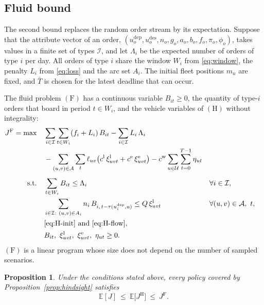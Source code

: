 \documentclass[12pt]{article}
\theoremstyle{plain}
\newtheorem{proposition}{Proposition}
\theoremstyle{definition}
\newcommand{\dep}{u^{\mathrm{dep}}}
\newcommand{\des}{u^{\mathrm{des}}}
\begin{document}
\subsection{Fluid bound}\label{sec:fluid}

The second bound replaces the random order stream by its expectation. Suppose that the attribute vector of an order, $(\dep_o,\des_o,n_o,g_o,a_o,b_o,f_o,\pi_o,\phi_o)$, takes values in a finite set of types $\mathcal{I}$, and let $\Lambda_i$ be the expected number of orders of type $i$ per day. All orders of type $i$ share the window $W_i$ from \eqref{eq:window}, the penalty $L_i$ from \eqref{eq:loss} and the arc set $A_i$. The initial fleet positions $m_u$ are fixed, and $\bar T$ is chosen for the latest deadline that can occur.

The fluid problem $(\mathrm{F})$ has a continuous variable $B_{it}\ge 0$, the quantity of type-$i$ orders that board in period $t\in W_i$, and the vehicle variables of $(\mathrm{H})$ without integrality:
\begin{align}
J^{\mathrm{F}}=\max\quad
& \sum_{i\in\mathcal{I}}\sum_{t\in W_i}(f_i+L_i)\,B_{it}-\sum_{i\in\mathcal{I}}L_i\,\Lambda_i \notag\\
& -\sum_{(u,v)\in\mathcal{A}}\sum_{t}\ell_{uv}\bigl(c^{\mathrm{l}}\,\xi^{\mathrm{l}}_{uvt}+c^{\mathrm{e}}\,\xi^{\mathrm{e}}_{uvt}\bigr)
 -c^{\mathrm{w}}\sum_{u\in\mathcal{U}}\sum_{t=0}^{T-1}\eta_{ut} \label{eq:F-obj}\\[4pt]
\text{s.t.}\quad
& \sum_{t\in W_i}B_{it}\le\Lambda_i && \forall i\in\mathcal{I}, \label{eq:F-demand}\\
& \sum_{i\in\mathcal{I}:\ (u,v)\in A_i} n_i\,B_{i,\,t-\tau(\dep_i,u)}\le Q\,\xi^{\mathrm{l}}_{uvt} && \forall (u,v)\in\mathcal{A},\ t, \label{eq:F-seats}\\
& \text{\eqref{eq:H-init} and \eqref{eq:H-flow}}, \notag\\
& B_{it},\ \xi^{\mathrm{l}}_{uvt},\ \xi^{\mathrm{e}}_{uvt},\ \eta_{ut}\ge 0. \label{eq:F-domain}
\end{align}
$(\mathrm{F})$ is a linear program whose size does not depend on the number of sampled scenarios.

\begin{proposition}\label{prop:fluid}
Under the conditions stated above, every policy covered by Proposition~\ref{prop:hindsight} satisfies
\[
\mathbb{E}[J]\ \le\ \mathbb{E}\bigl[J^{\mathrm{H}}\bigr]\ \le\ J^{\mathrm{F}} .
\]
\end{proposition}
\end{document}
